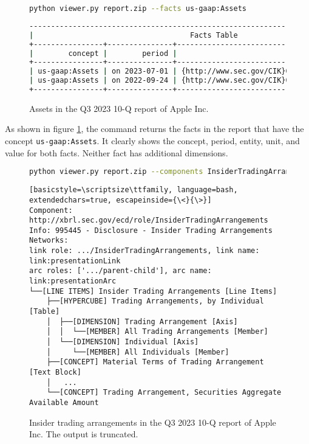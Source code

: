 \begin{figure}[H]
    \centering
    \caption{Assets in the Q3 2023 10-Q report of Apple Inc.}
    \begin{lstlisting}[language=bash]
python viewer.py report.zip --facts us-gaap:Assets
\end{lstlisting}
    \begin{lstlisting}[language=bash, basicstyle=\scriptsize\ttfamily]
--------------------------------------------------------------------------------------------+
|                                    Facts Table                                            |
+----------------+---------------+------------------------------------+------+--------------+
|        concept |        period |                             entity | unit |        value |
+----------------+---------------+------------------------------------+------+--------------+
| us-gaap:Assets | on 2023-07-01 | {http://www.sec.gov/CIK}0000320193 |  usd | 335038000000 |
| us-gaap:Assets | on 2022-09-24 | {http://www.sec.gov/CIK}0000320193 |  usd | 352755000000 |
+----------------+---------------+------------------------------------+------+--------------+
\end{lstlisting}
    \label{fig:aapl_assets}
\end{figure}

As shown in figure \ref{fig:aapl_assets}, the command returns the facts in the report that have the concept \texttt{us-gaap:Assets}.
It clearly shows the concept, period, entity, unit, and value for both facts.
Neither fact has additional dimensions.

\begin{figure}[H]
    \caption{Insider trading arrangements in the Q3 2023 10-Q report of Apple Inc. The output is truncated.}
    \begin{lstlisting}[language=bash]
python viewer.py report.zip --components InsiderTradingArrangements
\end{lstlisting}
    \begin{lstlisting}[basicstyle=\scriptsize\ttfamily, language=bash, extendedchars=true, escapeinside={\<}{\>}]
Component: http://xbrl.sec.gov/ecd/role/InsiderTradingArrangements
Info: 995445 - Disclosure - Insider Trading Arrangements
Networks: 
link role: .../InsiderTradingArrangements, link name: link:presentationLink
arc roles: ['.../parent-child'], arc name: link:presentationArc
└──[LINE ITEMS] Insider Trading Arrangements [Line Items]
    ├──[HYPERCUBE] Trading Arrangements, by Individual [Table]
    │  ├──[DIMENSION] Trading Arrangement [Axis]
    │  │  └──[MEMBER] All Trading Arrangements [Member]
    │  └──[DIMENSION] Individual [Axis]
    │     └──[MEMBER] All Individuals [Member]
    ├──[CONCEPT] Material Terms of Trading Arrangement [Text Block]
    │   ...
    └──[CONCEPT] Trading Arrangement, Securities Aggregate Available Amount
\end{lstlisting}
\label{fig:aapl_insider_trading}
\end{figure}


